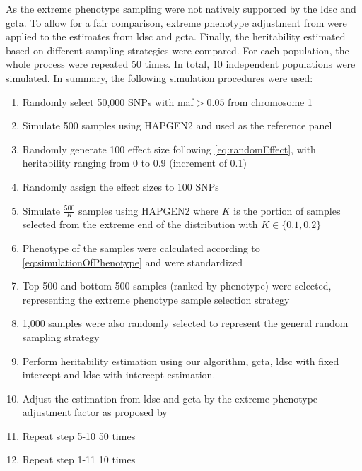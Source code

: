 		As the extreme phenotype sampling were not natively supported by the \gls{ldsc} and \gls{gcta}.
		To allow for a fair comparison, extreme phenotype adjustment from \citet{Sham2014} were applied to the estimates from \gls{ldsc} and \gls{gcta}.
		Finally, the heritability estimated based on different sampling strategies were compared.
		For each population, the whole process were repeated 50 times. 
		In total, 10 independent populations were simulated. 
		In summary, the following simulation procedures were used:
		\begin{enumerate}
			\item Randomly select 50,000 \glspl{SNP} with \gls{maf}$>0.05$ from chromosome 1
			\item Simulate 500 samples using HAPGEN2 and used as the reference panel
			\item Randomly generate 100 effect size following \cref{eq:randomEffect}, with heritability ranging from 0 to 0.9 (increment of 0.1)
			\item Randomly assign the effect sizes to 100 \glspl{SNP}
			\item Simulate $\frac{500}{K}$ samples using HAPGEN2 where $K$ is the portion of samples selected from the extreme end of the distribution with $K\in\{0.1,0.2\}$
			\item Phenotype of the samples were calculated according to \cref{eq:simulationOfPhenotype} and were standardized
			\item Top 500 and bottom 500 samples (ranked by phenotype) were selected, representing the extreme phenotype sample selection strategy
			\item 1,000 samples were also randomly selected to represent the general random sampling strategy
			\item Perform heritability estimation using our algorithm, \gls{gcta}, \gls{ldsc} with fixed intercept and \gls{ldsc} with intercept estimation.
			\item Adjust the estimation from \gls{ldsc} and \gls{gcta} by the extreme phenotype adjustment factor as proposed by \citet{Sham2014}
			\item Repeat step 5-10 50 times
			\item Repeat step 1-11 10 times
		\end{enumerate}
		
		
	
